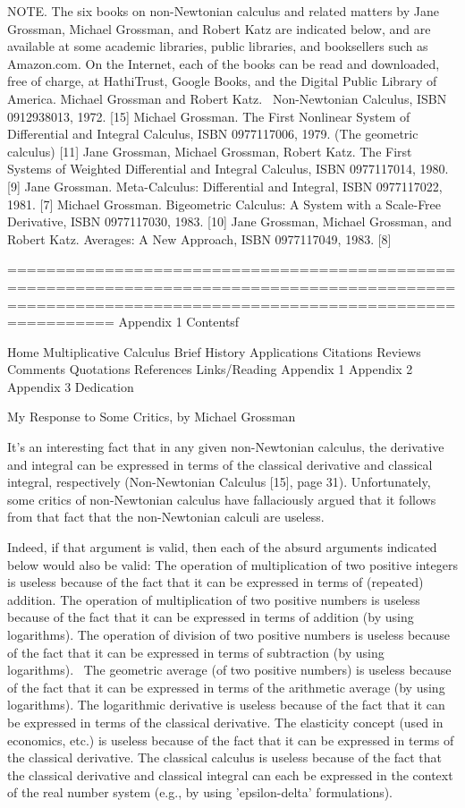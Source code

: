 \documentclass[12pt]{article}
\begin{document}
NOTE. The six books on non-Newtonian calculus and related matters by Jane Grossman, Michael Grossman, and Robert Katz are indicated below, and are available at some academic libraries, public libraries, and booksellers such as Amazon.com. On the Internet, each of the books can be read and downloaded, free of charge, at HathiTrust, Google Books, and the Digital Public Library of America.
Michael Grossman and Robert Katz.  Non-Newtonian Calculus, ISBN 0912938013, 1972. [15] 
Michael Grossman. The First Nonlinear System of Differential and Integral Calculus, ISBN 0977117006, 1979. (The geometric calculus) [11] 
Jane Grossman, Michael Grossman, Robert Katz. The First Systems of Weighted Differential and Integral Calculus, ISBN 0977117014, 1980. [9]
Jane Grossman. Meta-Calculus: Differential and Integral, ISBN 0977117022, 1981. [7]
Michael Grossman. Bigeometric Calculus: A System with a Scale-Free Derivative, ISBN 0977117030, 1983. [10]
Jane Grossman, Michael Grossman, and Robert Katz. Averages: A New Approach, ISBN 0977117049, 1983. [8]

=====================================================================================================================================================
Appendix 1
Contentsf

Home
Multiplicative Calculus
Brief History
Applications
Citations
Reviews
Comments
Quotations
References
Links/Reading
Appendix 1
Appendix 2
Appendix 3
Dedication

My Response to Some Critics, by Michael Grossman



It's an interesting fact that in any given non-Newtonian calculus, the derivative and integral can be expressed in terms of the classical derivative and classical integral, respectively (Non-Newtonian Calculus [15], page 31). Unfortunately, some critics of non-Newtonian calculus have fallaciously argued that it follows from that fact that the non-Newtonian calculi are useless.

Indeed, if that argument is valid, then each of the absurd arguments indicated below would also be valid:
The operation of multiplication of two positive integers is useless because of the fact that it can be expressed in terms of (repeated) addition.
The operation of multiplication of two positive numbers is useless because of the fact that it can be expressed in terms of addition (by using logarithms).
The operation of division of two positive numbers is useless because of the fact that it can be expressed in terms of subtraction (by using logarithms). 
The geometric average (of two positive numbers) is useless because of the fact that it can be expressed in terms of the arithmetic average (by using logarithms).
The logarithmic derivative is useless because of the fact that it can be expressed in terms of the classical derivative.
The elasticity concept (used in economics, etc.) is useless because of the fact that it can be expressed in terms of the classical derivative.
The classical calculus is useless because of the fact that the classical derivative and classical integral can each be expressed in the context of the real number system (e.g., by using 'epsilon-delta' formulations).
\end{document}
